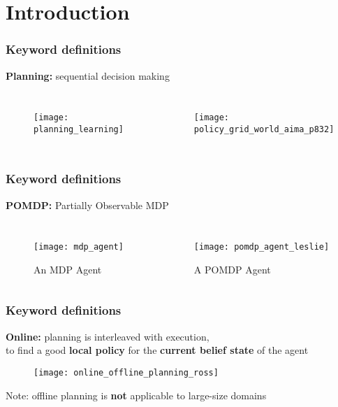 \section{Introduction}

\begin{frame}
\frametitle{Keyword definitions}
\textbf{Planning:} sequential decision making
\vspace{10mm}
\pause

\begin{columns}
    \begin{figure}
        \centering
        \texttt{[image: planning\_learning]}
    \end{figure}
    \begin{figure}
        \centering
        \texttt{[image: policy\_grid\_world\_aima\_p832]}
    \end{figure}
\end{columns}
\end{frame}

\begin{frame}
\frametitle{Keyword definitions}
\textbf{POMDP:} Partially Observable MDP
\pause

\begin{columns}
    \begin{figure}
        \centering
        \texttt{[image: mdp\_agent]}
        \caption{An MDP Agent}
    \end{figure}
    \begin{figure}
        \centering
        \texttt{[image: pomdp\_agent\_leslie]}
        \caption{A POMDP Agent}
    \end{figure}
\end{columns}

\end{frame}

\begin{frame}
\frametitle{Keyword definitions}
\textbf{Online:} planning is interleaved with execution, \\
to find a good \textbf{local policy} for the \textbf{current belief state} of the agent
\pause

\begin{figure}
    \centering
    \texttt{[image: online\_offline\_planning\_ross]}
\end{figure}
\pause

Note: offline planning is \textbf{not} applicable to large-size domains
\end{frame}

